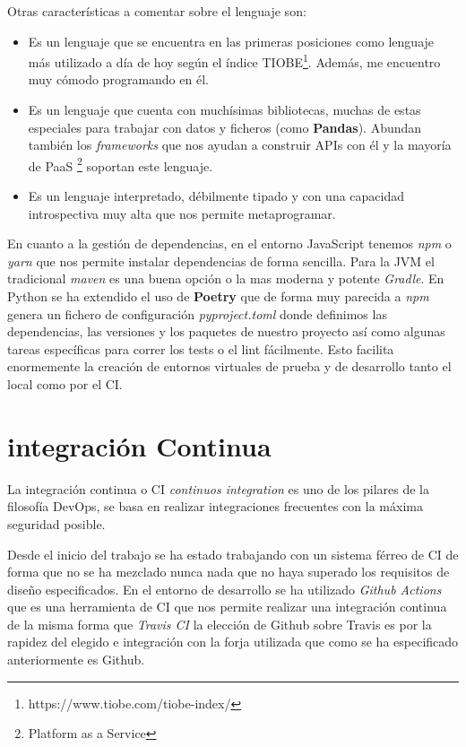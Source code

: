 Otras características a comentar sobre el lenguaje son:
\begin{itemize}
    \item Es un lenguaje que se encuentra en las primeras posiciones como lenguaje más utilizado a día de hoy según el índice TIOBE\footnote{https://www.tiobe.com/tiobe-index/}. Además, me encuentro muy cómodo programando en él.
    \item Es un lenguaje que cuenta con muchísimas bibliotecas, muchas de estas especiales para trabajar con datos y ficheros (como \textbf{Pandas}). Abundan también los \textit{frameworks} que nos ayudan a construir APIs con él y la mayoría de PaaS \footnote{Platform as a Service} soportan este lenguaje.
    \item Es un lenguaje interpretado, débilmente tipado y con una capacidad introspectiva muy alta que nos permite metaprogramar.
\end{itemize}

En cuanto a la gestión de dependencias, en el entorno JavaScript tenemos \textit{npm} o \textit{yarn} que nos permite
instalar dependencias de forma sencilla. Para la JVM el tradicional \textit{maven} es una buena opción o la mas moderna
y potente \textit{Gradle}. En Python se ha extendido el uso de \textbf{Poetry} que de forma muy parecida a \textit{npm}
genera un fichero de configuración \textit{pyproject.toml} donde definimos las dependencias, las versiones y los paquetes
de nuestro proyecto así como algunas tareas específicas para correr los tests o el lint fácilmente. Esto facilita
enormemente la creación de entornos virtuales de prueba y de desarrollo tanto el local como por el CI.


\section{integración Continua}
La integración continua o CI \textit{continuos integration} es uno de los pilares de la filosofía DevOps, se basa en realizar integraciones frecuentes con la máxima seguridad posible.

Desde el inicio del trabajo se ha estado trabajando con un sistema férreo de CI de forma que no se ha mezclado nunca nada que no haya superado los requisitos de diseño especificados. En el entorno de desarrollo se ha utilizado \textit{Github Actions} que es una herramienta de CI que nos permite realizar una integración continua de la misma forma que \textit{Travis CI} la elección de Github sobre Travis es por la rapidez del elegido e integración con la forja utilizada que como se ha especificado anteriormente es Github.

